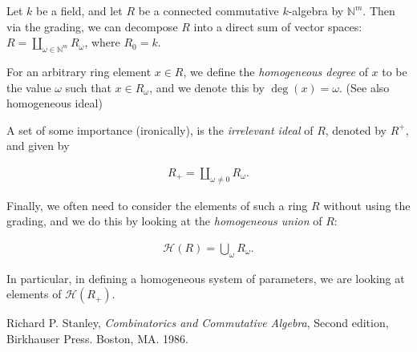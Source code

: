 \documentclass[12pt]{article}
\newcommand{\mb}{\mathbb}
\newcommand{\<}{\langle}
\renewcommand{\>}{\rangle}
\begin{document}
Let $k$ be a field, and let $R$ be a connected commutative $k$-algebra  by $\mb{N}^m$.  Then via the grading, we can decompose $R$ into a direct sum of vector spaces:  $R=\coprod_{\omega\in\mb{N}^m} R_\omega$, where $R_0=k$.

For an arbitrary ring element $x\in R$, we define the \emph{homogeneous degree} of $x$ to be the value $\omega$ such that $x\in R_\omega$, and we denote this by $\deg(x)=\omega$.  (See also homogeneous ideal)

A set of some importance (ironically), is the \emph{irrelevant ideal} of $R$, denoted by $R^+$, and given by

\begin{align*}
R_+=\coprod_{\omega\neq 0}R_\omega.
\end{align*}

Finally, we often need to consider the elements of such a ring $R$ without using the grading, and we do this by looking at the \emph{homogeneous union} of $R$:

\begin{align*}
\mathcal{H}(R)=\bigcup_\omega R_\omega.
\end{align*}

In particular, in defining a homogeneous system of parameters, we are looking at elements of $\mathcal{H}(R_+)$.
\begin{thebibliography}{9}
 Richard P. Stanley, {\em Combinatorics and Commutative Algebra}, Second edition, Birkhauser Press.  Boston, MA.  1986.
\end{thebibliography}
\end{document}
